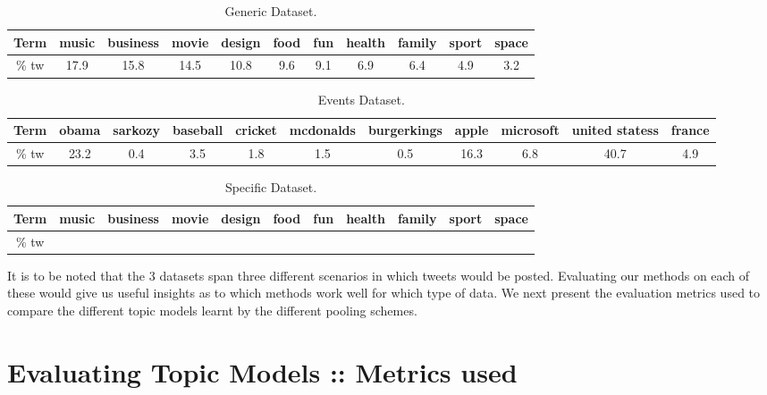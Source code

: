\documentclass[10pt,a5paper,twoside]{article}
\begin{document}
\begin{table}[!h]
\setcounter{table}{0}
\centering
	\begin{tabular}{|c|c|c|c|c|c|c|c|c|c|c|}
	\hline
	Term & music & business & movie & design & food & fun & health & family & sport & space\\
	\hline
	\% tw & 17.9 & 15.8 & 14.5 & 10.8 & 9.6 & 9.1 & 6.9 & 6.4 & 4.9 & 3.2 \\
	\hline
	\end{tabular}
\caption{Generic Dataset.}\label{Dataset}
\end{table}

\begin{table}[!h]
\setcounter{table}{1}
\centering
	\begin{tabular}{|c|c|c|c|c|c|c|c|c|c|c|}
	\hline
	Term & obama & sarkozy & baseball & cricket & mcdonalds & burgerkings & apple & microsoft & united statess & france\\
	\hline
	\% tw & 23.2 & 0.4 & 3.5 & 1.8 & 1.5 & 0.5 & 16.3 & 6.8 & 40.7 & 4.9 \\
	\hline
	\end{tabular}
\caption{Events Dataset.}\label{Dataset}
\end{table}

\begin{table}[!h]
\setcounter{table}{2}
\centering
	\begin{tabular}{|c|c|c|c|c|c|c|c|c|c|c|}
	\hline
	Term & music & business & movie & design & food & fun & health & family & sport & space\\
	\hline
	\% tw &  &  &  &  &  &  &  &  &  &  \\
	\hline
	\end{tabular}
\caption{Specific Dataset.}\label{Table}
\end{table}

It is to be noted that the 3 datasets span three different scenarios in which  tweets would be posted. Evaluating our methods on each of these would give us useful insights as to which methods work well for which type of data. We next present the evaluation metrics used to compare the different topic models learnt by the different pooling schemes. \\


\section{Evaluating Topic Models :: Metrics used}
\end{document}
